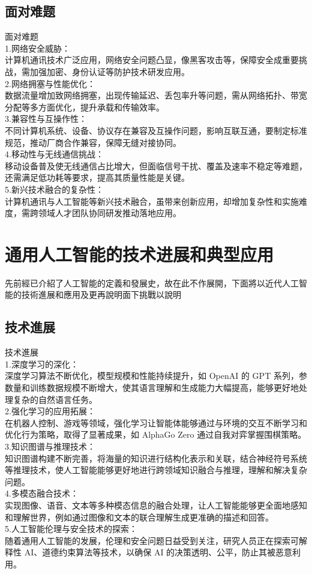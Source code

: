 \documentclass[supercite]{Experimental_Report}
\theoremstyle{definition}
\begin{document}
	\subsection{面对难题}
	面对难题\\
	1.网络安全威胁：\\计算机通讯技术广泛应用，网络安全问题凸显，像黑客攻击等，保障安全成重要挑战，需加强加密、身份认证等防护技术研发应用。\\
	2.网络拥塞与性能优化：\\数据流量增加致网络拥塞，出现传输延迟、丢包率升等问题，需从网络拓扑、带宽分配等多方面优化，提升承载和传输效率。\\
	3.兼容性与互操作性：\\不同计算机系统、设备、协议存在兼容及互操作问题，影响互联互通，要制定标准规范，推动厂商合作兼容，保障无缝对接协同。\\
	4.移动性与无线通信挑战：\\移动设备普及使无线通信占比增大，但面临信号干扰、覆盖及速率不稳定等难题，还需满足低功耗等要求，提高其质量性能是关键。\\
	5.新兴技术融合的复杂性：\\计算机通讯与人工智能等新兴技术融合，虽带来创新应用，却增加复杂性和实施难度，需跨领域人才团队协同研发推动落地应用。
	
	
	\section{通用人工智能的技术进展和典型应用}
	先前經已介紹了人工智能的定義和發展史，故在此不作展開，下面將以近代人工智能的技術進展和應用及更再說明面下挑戰以說明
	\subsection{技术進展}
	技术進展\\
	1.深度学习的深化：\\深度学习算法不断优化，模型规模和性能持续提升，如 OpenAI 的 GPT 系列，参数量和训练数据规模不断增大，使其语言理解和生成能力大幅提高，能够更好地处理复杂的自然语言任务。\\
	2.强化学习的应用拓展：\\在机器人控制、游戏等领域，强化学习让智能体能够通过与环境的交互不断学习和优化行为策略，取得了显著成果，如 AlphaGo Zero 通过自我对弈掌握围棋策略。\\
	3.知识图谱与推理技术：\\知识图谱构建不断完善，将海量的知识进行结构化表示和关联，结合神经符号系统等推理技术，使人工智能能够更好地进行跨领域知识融合与推理，理解和解决复杂问题。\\
	4.多模态融合技术：\\实现图像、语音、文本等多种模态信息的融合处理，让人工智能能够更全面地感知和理解世界，例如通过图像和文本的联合理解生成更准确的描述和回答。\\
	5.人工智能伦理与安全技术的探索：\\随着通用人工智能的发展，伦理和安全问题日益受到关注，研究人员正在探索可解释性 AI、道德约束算法等技术，以确保 AI 的决策透明、公平，防止其被恶意利用。
\end{document}
